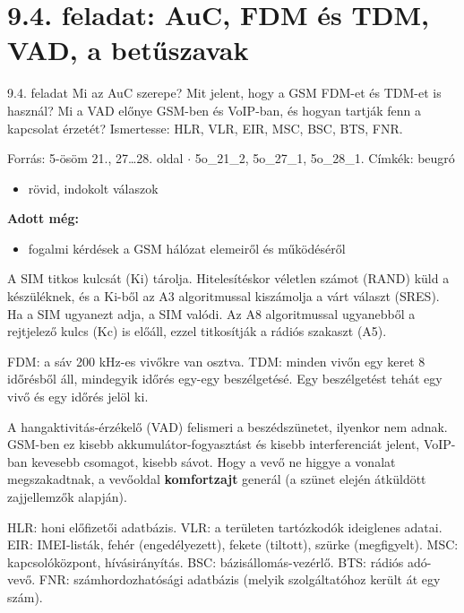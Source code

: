 \section{\texorpdfstring{9.4. feladat: AuC, FDM és TDM, VAD, a betűszavak}{9.4. feladat: AuC, FDM és TDM, VAD, a betűszavak}}\label{o9_04}
\setcounter{lepes}{0}
\begin{feladat}{9.4. feladat}
Mi az AuC szerepe? Mit jelent, hogy a GSM FDM-et és TDM-et is használ? Mi a VAD előnye GSM-ben és VoIP-ban, és hogyan tartják fenn a kapcsolat érzetét? Ismertesse: HLR, VLR, EIR, MSC, BSC, BTS, FNR.

{\footnotesize\sffamily Forrás: 5-ösöm 21., 27\ldots{}28. oldal $\cdot$ 5o\_21\_2, 5o\_27\_1, 5o\_28\_1. Címkék: beugró}
\end{feladat}
\begin{keresunk}
\begin{itemize}
\item rövid, indokolt válaszok
\end{itemize}
\end{keresunk}
\begin{jeloles}
\par\smallskip\textbf{Adott még:}
\begin{itemize}
\item fogalmi kérdések a GSM hálózat elemeiről és működéséről
\end{itemize}
\end{jeloles}

A SIM titkos kulcsát (Ki) tárolja. Hitelesítéskor véletlen számot (RAND) küld a készüléknek, és a Ki-ből az A3 algoritmussal kiszámolja a várt választ (SRES). Ha a SIM ugyanezt adja, a SIM valódi. Az A8 algoritmussal ugyanebből a rejtjelező kulcs (Kc) is előáll, ezzel titkosítják a rádiós szakaszt (A5).

FDM: a sáv 200 kHz-es vivőkre van osztva. TDM: minden vivőn egy keret 8 időrésből áll, mindegyik időrés egy-egy beszélgetésé. Egy beszélgetést tehát egy vivő és egy időrés jelöl ki.

A hangaktivitás-érzékelő (VAD) felismeri a beszédszünetet, ilyenkor nem adnak. GSM-ben ez kisebb akkumulátor-fogyasztást és kisebb interferenciát jelent, VoIP-ban kevesebb csomagot, kisebb sávot. Hogy a vevő ne higgye a vonalat megszakadtnak, a vevőoldal \textbf{komfortzajt} generál (a szünet elején átküldött zajjellemzők alapján).

HLR: honi előfizetői adatbázis. VLR: a területen tartózkodók ideiglenes adatai. EIR: IMEI-listák, fehér (engedélyezett), fekete (tiltott), szürke (megfigyelt). MSC: kapcsolóközpont, hívásirányítás. BSC: bázisállomás-vezérlő. BTS: rádiós adó-vevő. FNR: számhordozhatósági adatbázis (melyik szolgáltatóhoz került át egy szám).
\begin{eredmeny}

\begin{center}\end{center}
\end{eredmeny}
